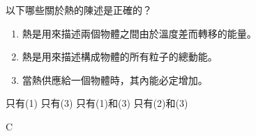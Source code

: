 {
    以下哪些關於熱的陳述是正確的？
    \begin{enumerate}[label=\sd]
        \item 熱是用來描述兩個物體之間由於溫度差而轉移的能量。
        \item 熱是用來描述構成物體的所有粒子的總動能。
        \item 當熱供應給一個物體時，其內能必定增加。
    \end{enumerate}
    \begin{choices}
        \choice 只有(1)
        \choice 只有(3)
        \CorrectChoice 只有(1)和(3)
        \choice 只有(2)和(3)
    \end{choices}
}{\mckey C}

